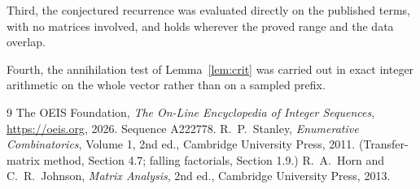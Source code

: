 \documentclass[11pt,a4paper]{article}
\theoremstyle{plain}
\theoremstyle{definition}
\begin{document}
Third, the conjectured recurrence was evaluated directly on the published terms, with no
matrices involved, and holds wherever the proved range and the data overlap.

Fourth, the annihilation test of Lemma~\ref{lem:crit} was carried out in exact integer
arithmetic on the whole vector rather than on a sampled prefix.

\begin{thebibliography}{9}
 The OEIS Foundation, \emph{The On-Line Encyclopedia of Integer
Sequences}, \url{https://oeis.org}, 2026. Sequence A222778.
 R.~P.~Stanley, \emph{Enumerative Combinatorics}, Volume 1, 2nd ed.,
Cambridge University Press, 2011. (Transfer-matrix method, Section 4.7; falling factorials,
Section 1.9.)
 R.~A.~Horn and C.~R.~Johnson, \emph{Matrix Analysis}, 2nd ed., Cambridge
University Press, 2013.
\end{thebibliography}
\end{document}
